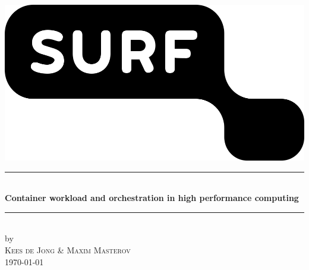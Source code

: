 \documentclass[12pt]{article}
\begin{document}
\begin{titlepage}

\newcommand{\HRule}{\rule{\linewidth}{0.5mm}}

\begin{center}
\includegraphics[width=\linewidth/3]{images/surf.png}

\HRule \\[0.4cm]
{\huge \bfseries Container workload and orchestration in high performance computing}\\[0.4cm]
\HRule \\[0.5cm]
 
by\\[0.2cm]
\textsc{\Large Kees de Jong \& Maxim Masterov}\\[0.2cm]

{\Large \today}\\[1cm]

\vfill

\end{center}
\end{titlepage}



\end{document}
